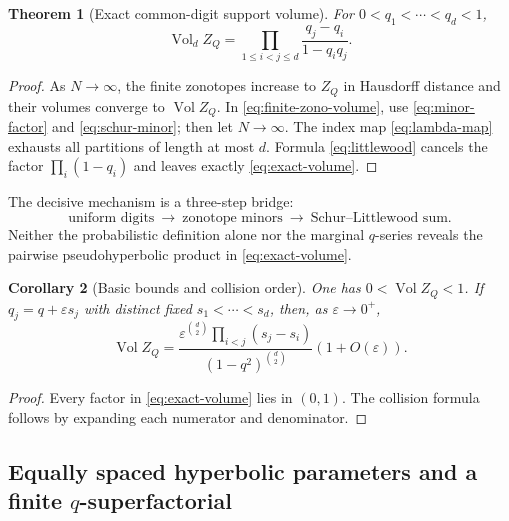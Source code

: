 \documentclass[11pt,a4paper]{article}
\newtheorem{theorem}{Theorem}[section]
\newtheorem{corollary}[theorem]{Corollary}
\theoremstyle{definition}
\theoremstyle{remark}
\newcommand{\Vol}{\operatorname{Vol}}
\begin{document}
\begin{theorem}[Exact common-digit support volume]
\label{thm:exact-volume}
For $0<q_1<\cdots<q_d<1$,
\begin{equation}
 \boxed{
  \Vol_d Z_Q
   =\prod_{1\le i<j\le d}
      \frac{q_j-q_i}{1-q_iq_j}.}
 \label{eq:exact-volume}
\end{equation}
\end{theorem}

\begin{proof}
As $N\to\infty$, the finite zonotopes increase to $Z_Q$ in Hausdorff distance and their volumes converge to $\Vol Z_Q$.  In \eqref{eq:finite-zono-volume}, use \eqref{eq:minor-factor} and \eqref{eq:schur-minor}; then let $N\to\infty$.  The index map \eqref{eq:lambda-map} exhausts all partitions of length at most $d$.  Formula \eqref{eq:littlewood} cancels the factor $\prod_i(1-q_i)$ and leaves exactly \eqref{eq:exact-volume}.
\end{proof}

\begin{provedbox}
The decisive mechanism is a three-step bridge:
\[
  \text{uniform digits}\ \longrightarrow\
  \text{zonotope minors}\ \longrightarrow\
  \text{Schur--Littlewood sum}.
\]
Neither the probabilistic definition alone nor the marginal $q$-series reveals the pairwise pseudohyperbolic product in \eqref{eq:exact-volume}.
\end{provedbox}

\begin{corollary}[Basic bounds and collision order]
\label{cor:volume-bounds}
One has $0<\Vol Z_Q<1$.  If $q_j=q+\varepsilon s_j$ with distinct fixed $s_1<\cdots<s_d$, then, as $\varepsilon\to0^+$,
\begin{equation}
  \Vol Z_Q
  =\frac{\varepsilon^{\binom d2}\prod_{i<j}(s_j-s_i)}
         {(1-q^2)^{\binom d2}}
    \left(1+O(\varepsilon)\right).
  \label{eq:q-collision}
\end{equation}
\end{corollary}

\begin{proof}
Every factor in \eqref{eq:exact-volume} lies in $(0,1)$.  The collision formula follows by expanding each numerator and denominator.
\end{proof}

\subsection{Equally spaced hyperbolic parameters and a finite \texorpdfstring{$q$}{q}-superfactorial}
\label{subsec:q-superfactorial}
\end{document}
